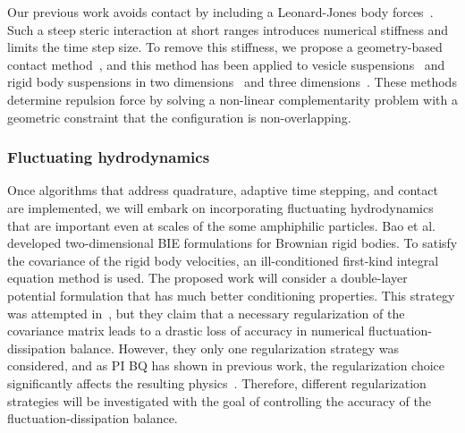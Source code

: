 Our previous work avoids contact by including a Leonard-Jones body
forces~\cite{Fu2018_SIAM}. Such a steep steric interaction at short
ranges introduces numerical stiffness and limits the time step size. To
remove this stiffness, we propose a geometry-based contact
method~\cite{har-pon-sor-zor2011}, and this method has been applied to
vesicle suspensions~\cite{lu-rah-zor2017} and rigid body suspensions in
two dimensions~\cite{bys-sha-qua2020} and three
dimensions~\cite{Yan2019}. These methods determine repulsion force by
solving a non-linear complementarity problem with a geometric constraint
that the configuration is non-overlapping.


\subsubsection{Fluctuating hydrodynamics}
\label{subsec:fluctuating}
Once algorithms that address quadrature, adaptive time stepping, and
contact are implemented, we will embark on incorporating fluctuating
hydrodynamics that are important even at scales of the some amphiphilic
particles. Bao et al.~\cite{Bao17,Bao18} developed two-dimensional BIE
formulations for Brownian rigid bodies. To satisfy the covariance of the
rigid body velocities, an ill-conditioned first-kind integral equation
method is used. The proposed work will consider a double-layer potential
formulation that has much better conditioning properties. This strategy
was attempted in~\cite{Bao18}, but they claim that a necessary
regularization of the covariance matrix leads to a drastic loss of
accuracy in numerical fluctuation-dissipation balance. However, they
only one regularization strategy was considered, and as PI BQ has
shown in previous work, the regularization choice significantly affects
the resulting physics~\cite{ong-chr-qua2017}. Therefore, different
regularization strategies will be investigated with the goal of
controlling the accuracy of the fluctuation-dissipation balance.


